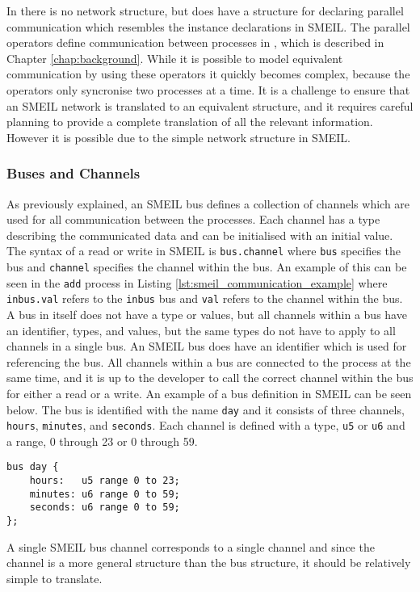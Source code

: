 In \cspm{} there is no network structure, but \cspm{} does have a structure for declaring parallel communication which resembles the instance declarations in SMEIL. The parallel operators define communication between processes in \cspm{}, which is described in Chapter \ref{chap:background}.
While it is possible to model equivalent communication by using these operators it quickly becomes complex, because the operators only syncronise two processes at a time. It is a challenge to ensure that an SMEIL network is translated to an equivalent \cspm{} structure, and it requires careful planning to provide a complete translation of all the relevant information. However it is possible due to the simple network structure in SMEIL.
\subsubsection{Buses and Channels}
\label{bus_and_channels}
As previously explained, an SMEIL bus defines a collection of channels which are used for all communication between the processes. Each channel has a type describing the communicated data and can be initialised with an initial value. The syntax of a read or write in SMEIL is \texttt{bus.channel} where \texttt{bus} specifies the bus and \texttt{channel} specifies the channel within the bus. An example of this can be seen in the \texttt{add} process in Listing \ref{lst:smeil_communication_example} where \texttt{inbus.val} refers to the \texttt{inbus} bus and \texttt{val} refers to the channel within the bus.
A bus in itself does not have a type or values, but all channels within a bus have an identifier, types, and values, but the same types do not have to apply to all channels in a single bus. An SMEIL bus does have an identifier which is used for referencing the bus. All channels within a bus are connected to the process at the same time, and it is up to the developer to call the correct channel within the bus for either a read or a write.
An example of a bus definition in SMEIL can be seen below. The bus is identified with the name \texttt{day} and it consists of three channels, \texttt{hours}, \texttt{minutes}, and \texttt{seconds}. Each channel is defined with a type, \texttt{u5} or \texttt{u6} and a range, 0 through 23 or 0 through 59.
\begin{verbatim}
bus day {
    hours:   u5 range 0 to 23;
    minutes: u6 range 0 to 59;
    seconds: u6 range 0 to 59;
};
\end{verbatim}
A single SMEIL bus channel corresponds to a single \cspm{} channel and since the channel is a more general structure than the bus structure, it should be relatively simple to translate.
